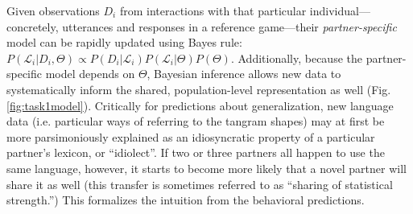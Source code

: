 
Given observations $D_i$ from interactions with that particular individual---concretely, utterances and responses in a reference game---their \emph{partner-specific} model can be rapidly updated using Bayes rule:
$%
P(\mathcal{L}_i | D_i, \Theta)  \propto P(D_i | \mathcal{L}_i) P(\mathcal{L}_i | \Theta)P(\Theta)
$.
Additionally, because the partner-specific model depends on $\Theta$, Bayesian inference allows new data to systematically inform the shared, population-level representation as well (Fig. \ref{fig:task1model}).
Critically for predictions about generalization, new language data (i.e. particular ways of referring to the tangram shapes) may at first be more parsimoniously explained as an idiosyncratic property of a particular partner's lexicon, or ``idiolect''. 
If two or three partners all happen to use the same language, however, it starts to become more likely that a novel partner will share it as well (this transfer is sometimes referred to as ``sharing of statistical strength.'')
This formalizes the intuition from the behavioral predictions.



